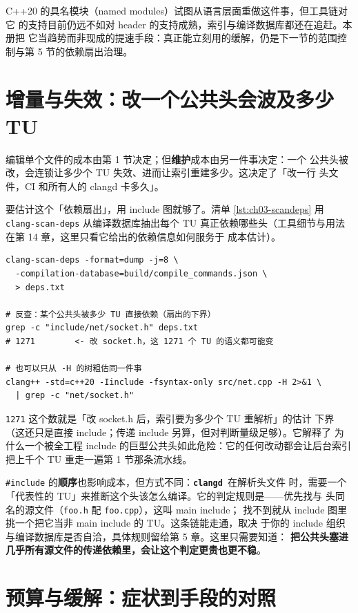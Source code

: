 \documentclass[12pt,a4paper,fontset=fandol]{ctexbook}
\newcommand{\cpp}[1]{C++#1}
\newcommand{\Lib}[1]{\textbf{\texttt{#1}}}
\newcommand{\CD}{\Lib{clangd}}
\begin{document}
\cpp{20} 的具名模块（named modules）试图从语言层面重做这件事，但工具链对它
的支持目前仍远不如对 header 的支持成熟，索引与编译数据库都还在追赶。本册把
它当趋势而非现成的提速手段：真正能立刻用的缓解，仍是下一节的范围控制与第 5
节的依赖扇出治理。

\section{增量与失效：改一个公共头会波及多少 TU}
\label{sec:ch03-s5}

编辑单个文件的成本由第 1 节决定；但\textbf{维护}成本由另一件事决定：一个
公共头被改，会连锁让多少个 TU 失效、进而让索引重建多少。这决定了「改一行
头文件，CI 和所有人的 clangd 卡多久」。

要估计这个「依赖扇出」，用 include 图就够了。清单
\ref{lst:ch03-scandeps} 用 \texttt{clang-scan-deps} 从编译数据库抽出每个 TU
真正依赖哪些头（工具细节与用法在第 14 章，这里只看它给出的依赖信息如何服务于
成本估计）。

\begin{lstlisting}[style=shellstyle,caption={用 clang-scan-deps 抽出每个 TU 的头依赖},label={lst:ch03-scandeps}]
clang-scan-deps -format=dump -j=8 \
  -compilation-database=build/compile_commands.json \
  > deps.txt

# 反查：某个公共头被多少 TU 直接依赖（扇出的下界）
grep -c "include/net/socket.h" deps.txt
# 1271        <- 改 socket.h，这 1271 个 TU 的语义都可能变

# 也可以只从 -H 的树粗估同一件事
clang++ -std=c++20 -Iinclude -fsyntax-only src/net.cpp -H 2>&1 \
  | grep -c "net/socket.h"
\end{lstlisting}

\texttt{1271} 这个数就是「改 socket.h 后，索引要为多少个 TU 重解析」的估计
下界（这还只是直接 include；传递 include 另算，但对判断量级足够）。它解释了
为什么一个被全工程 include 的巨型公共头如此危险：它的任何改动都会让后台索引
把上千个 TU 重走一遍第 1 节那条流水线。

\texttt{\#include} 的\textbf{顺序}也影响成本，但方式不同：\CD\ 在解析头文件
时，需要一个「代表性的 TU」来推断这个头该怎么编译。它的判定规则是——优先找与
头同名的源文件（\texttt{foo.h} 配 \texttt{foo.cpp}），这叫 main include；
找不到就从 include 图里挑一个把它当非 main include 的 TU。这条链能走通，取决
于你的 include 组织与编译数据库是否自洽，具体规则留给第 5 章。这里只需要知道：
\textbf{把公共头塞进几乎所有源文件的传递依赖里，会让这个判定更贵也更不稳}。

\section{预算与缓解：症状到手段的对照}
\label{sec:ch03-s6}
\end{document}
